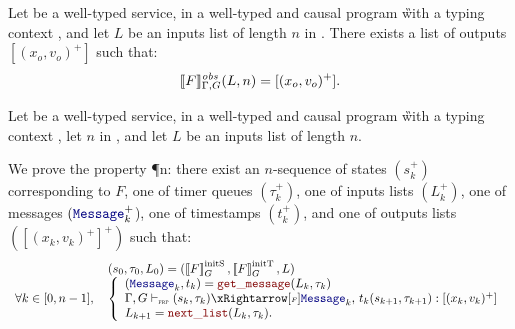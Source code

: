 \begin{theorem}
    \label{thm:semantics:grfrp:theorems:productivity}
    Let  be a well-typed service, in a well-typed and causal program \G with a
    typing context \tyCtx, and let $L$ be an inputs list of length $n$ in \Nstar.
    There exists a list of outputs $[(x_o, v_o)^+]$ such that:
    \begin{equation*}
        \llbracket F \rrbracket^\textit{obs}_{\Gamma, G}(L, n) = [(x_o, v_o)^+].
    \end{equation*}
\end{theorem}
\begin{skippableproof}
    Let  be a well-typed service, in a well-typed and causal program \G with a
    typing context \tyCtx, let $n$ in \Nstar, and let $L$ be an inputs list of length $n$.

    We prove the property \P{n}: there exist an $n$-sequence of states $(s_k^+)$
    corresponding to $F$, one of timer queues $(\tau_k^+)$, one of inputs lists $(L_k^+)$, one of
    messages $(\mess_k^+$), one of timestamps $(t_k^+)$, and one of outputs lists $([(x_k, v_k)^+
            ]^+)$ such that:
    \begin{equation*}
        \begin{array}{ll}
                                       & (s_0, \tau_0, L_0) = (\initstate{F}, \inittimer{F}, L) \\
            \forall k \in [0, n-1], \, &
            \left\{
            \begin{array}{l}
                (\mess_k, t_k) = \getMess{L_k}{\tau_k}                                         \\
                \serviceOpSem{s_k}{\tau_k}{F}{\mess_k}{t_k}{s_{k+1}}{\tau_{k+1}}{(x_k, v_k)^+} \\
                L_{k+1} = \nextList{L_k}{\tau_k}.
            \end{array}
            \right.
        \end{array}
    \end{equation*}


\end{skippableproof}
